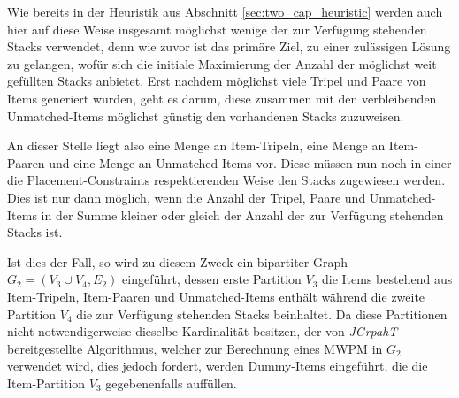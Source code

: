 Wie bereits in der Heuristik aus Abschnitt \ref{sec:two_cap_heuristic} werden auch hier auf diese Weise insgesamt möglichst wenige der zur Verfügung stehenden Stacks verwendet, denn wie zuvor ist das primäre Ziel, zu einer zulässigen Lösung zu gelangen, wofür sich die initiale Maximierung der Anzahl der möglichst weit gefüllten Stacks anbietet. Erst nachdem möglichst viele Tripel und Paare von Items generiert wurden, geht es darum, diese zusammen mit den verbleibenden Unmatched-Items möglichst günstig den vorhandenen Stacks zuzuweisen.

An dieser Stelle liegt also eine Menge an Item-Tripeln, eine Menge an Item-Paaren und eine Menge an Unmatched-Items vor. Diese müssen nun
noch in einer die Placement-Constraints respektierenden Weise den Stacks zugewiesen werden.
Dies ist nur dann möglich, wenn die Anzahl der Tripel, Paare und Unmatched-Items in der Summe kleiner oder gleich der Anzahl
der zur Verfügung stehenden Stacks ist.

Ist dies der Fall, so wird zu diesem Zweck ein bipartiter Graph $G_2 = (V_3 \cup V_4, E_2)$ eingeführt,
dessen erste Partition $V_3$ die Items bestehend aus Item-Tripeln, Item-Paaren und Unmatched-Items enthält während die zweite Partition $V_4$
die zur Verfügung stehenden Stacks beinhaltet. Da diese Partitionen nicht notwendigerweise dieselbe Kardinalität besitzen, der von \textit{JGrpahT} bereitgestellte Algorithmus, welcher zur Berechnung eines \textsc{MWPM} in $G_2$ verwendet wird, dies jedoch fordert, werden Dummy-Items
eingeführt, die die Item-Partition $V_3$ gegebenenfalls auffüllen.



